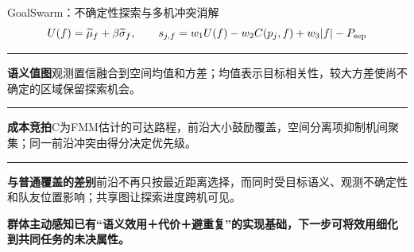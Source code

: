 \documentclass[aspectratio=169,10pt]{beamer}
\def\slidesource{}
\newcommand{\takeaway}[1]{\par\begin{takebox}\fontsize{9.1}{11.5}\selectfont\bfseries\color{navy}#1\end{takebox}}
\newcommand{\ph}[1]{{\color{teal}\rule[-0.35mm]{0.8mm}{3.1mm}}\hspace{1.1mm}\textbf{\color{navy}#1}}
\newcommand{\bline}[2]{\par\ph{#1}\quad #2\par\vspace{1.5mm}}
\begin{document}
\gdef\slidesource{\href{https://arxiv.org/html/2603.12908v2}{[25] GoalSwarm} · §III-C–III-E；Eqs.6–11（统一符号）}
\begin{frame}[t,label=goalswarm_math]{GoalSwarm：不确定性探索与多机冲突消解}
\relax
\[U(f)=\widetilde\mu_f+\beta\widetilde\sigma_f,\qquad s_{j,f}=w_1U(f)-w_2C(p_j,f)+w_3|f|-P_{\rm sep}\]\bline{语义值图}{观测置信融合到空间均值和方差；均值表示目标相关性，较大方差使尚不确定的区域保留探索机会。}
\bline{成本竞拍}{C为FMM估计的可达路程，前沿大小鼓励覆盖，空间分离项抑制机间聚集；同一前沿冲突由得分决定优先级。}
\bline{与普通覆盖的差别}{前沿不再只按最近距离选择，而同时受目标语义、观测不确定性和队友位置影响；共享图让探索进度跨机可见。}\takeaway{群体主动感知已有“语义效用＋代价＋避重复”的实现基础，下一步可将效用细化到共同任务的未决属性。}
\end{frame}
\gdef\slidesource{原文依据：\href{https://arxiv.org/html/2603.20804v2}{[26] Co-VLN}}
\end{document}
